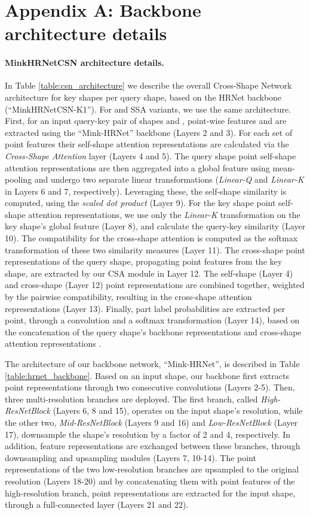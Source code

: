 \documentclass{egpubl}
\begin{document}
\section*{Appendix A: Backbone architecture details}

\paragraph*{MinkHRNetCSN architecture details.} In Table \ref{table:csn_architecture} we describe the overall Cross-Shape Network architecture for  key shapes per query shape, based on the HRNet \cite{HRNet:2019}
backbone (``MinkHRNetCSN-K1''). For  and SSA variants, we use the same architecture. First, for an input query-key pair of shapes  and , point-wise
features  and  are extracted using the ``Mink-HRNet'' backbone (Layers 2 and 3). For each set of point features their self-shape attention representations are calculated via the \textit{Cross-Shape Attention} layer (Layers 4 and 5). The query shape point self-shape attention representations are then aggregated into a global feature using mean-pooling and undergo two separate linear transformations (\textit{Linear-Q} and \textit{Linear-K} in Layers 6 and 7, respectively). Leveraging these, the self-shape similarity is computed, using the \textit{scaled dot product} (Layer 9). For the
key shape point self-shape attention representations, we use only the \textit{Linear-K} transformation on the key shape's global feature (Layer 8), and calculate the query-key similarity (Layer 10). The compatibility for the cross-shape attention is computed as the softmax transformation of these two
similarity measures (Layer 11). The cross-shape point representations of the query shape, propagating point features from the key shape, are extracted by our CSA module in Layer 12. The self-shape (Layer 4) and cross-shape (Layer 12) point representations are combined together, weighted by the pairwise compatibility, resulting in the cross-shape attention representations  (Layer 13). Finally, part label probabilities are extracted per point, through a  convolution and a softmax transformation (Layer 14), based on the concatenation of the query shape's backbone representations  and cross-shape attention representations .

The architecture of our backbone network, ``Mink-HRNet'', is described in Table \ref{table:hrnet_backbone}. Based on an input shape, our backbone first extracts point representations through two consecutive convolutions (Layers 2-5). Then, three multi-resolution branches are deployed. The first branch, called \textit{High-ResNetBlock} (Layers 6, 8 and 15), operates on the input shape's resolution, while the other two, \textit{Mid-ResNetBlock} (Layers 9 and 16) and \textit{Low-ResNetBlock} (Layer 17), downsample the shape's resolution by a factor of 2 and 4, respectively. In addition, feature representations are exchanged between these branches, through downsampling and upsampling modules (Layers 7, 10-14). The point representations of the two low-resolution branches are upsampled to the original resolution (Layers 18-20) and by concatenating them with point features of the high-resolution branch, point representations are extracted for the
input shape, through a full-connected layer (Layers 21 and 22). 
\end{document}
